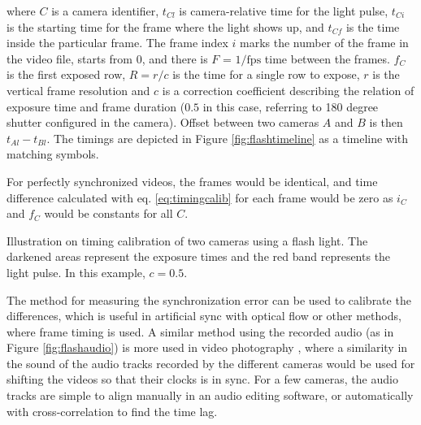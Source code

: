 where $C$ is a camera identifier, $t_{Cl}$ is camera-relative time for the light pulse, $t_{Ci}$ is the starting time for the frame where the light shows up, and $t_{Cf}$ is the time inside the particular frame.
The frame index $i$ marks the number of the frame in the video file, starts from 0, and there is $F$ = $1/\text{fps}$ time between the frames.
$f_C$ is the first exposed row, $R = r / c$ is the time for a single row to expose, $r$ is the vertical frame resolution and $c$ is a correction coefficient describing the relation of exposure time and frame duration ($0.5$ in this case, referring to 180 degree shutter configured in the camera).
Offset between two cameras $A$ and $B$ is then $t_{Al} - t_{Bl}$.
The timings are depicted in Figure \ref{fig:flashtimeline} as a timeline with matching symbols.

For perfectly synchronized videos, the frames would be identical, and time difference calculated with eq. \ref{eq:timingcalib} for each frame would be zero as $i_C$ and $f_C$ would be constants for all $C$.

{Illustration on timing calibration of two cameras using a flash light.
The darkened areas represent the exposure times and the red band represents the light pulse.
In this example, $c = 0.5$.
}




The method for measuring the synchronization error can be used to calibrate the differences, which is useful in artificial sync with optical flow or other methods, where frame timing is used.
A similar method using the recorded audio (as in Figure \ref{fig:flashaudio}) is more used in video photography \cite{pluraleyes,premierepromerge}, where a similarity in the sound of the audio tracks recorded by the different cameras would be used for shifting the videos so that their clocks is in sync.
For a few cameras, the audio tracks are simple to align manually in an audio editing software, or automatically with cross-correlation to find the time lag.

